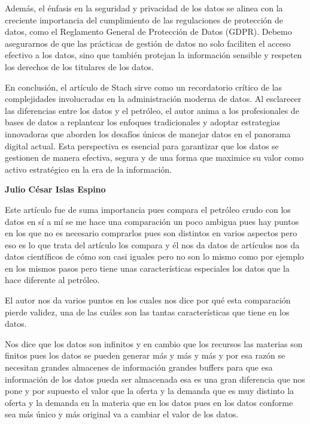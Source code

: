 Además, el énfasis en la seguridad y privacidad de los datos se alinea con la creciente importancia del cumplimiento de las regulaciones de protección de datos, como el Reglamento General de Protección de Datos (GDPR). Debemo asegurarnos de que las prácticas de gestión de datos no solo faciliten el acceso efectivo a los datos, sino que también protejan la información sensible y respeten los derechos de los titulares de los datos.

En conclusión, el artículo de Stach sirve como un recordatorio crítico de las complejidades involucradas en la administración moderna de datos. Al esclarecer las diferencias entre los datos y el petróleo, el autor anima a los profesionales de bases de datos a replantear los enfoques tradicionales y adoptar estrategias innovadoras que aborden los desafíos únicos de manejar datos en el panorama digital actual. Esta perspectiva es esencial para garantizar que los datos se gestionen de manera efectiva, segura y de una forma que maximice su valor como activo estratégico en la era de la información.

\begin{center}
    \textbf{Julio César Islas Espino}    
\end{center}

Este artículo fue de suma importancia pues compara el petróleo crudo con los datos en sí a mí se me hace una comparación un poco ambigua pues hay puntos en los que no es necesario comprarlos pues son distintos en varios aspectos pero eso es lo que trata del artículo los compara y él nos da datos de artículos nos da datos científicos de cómo son casi iguales pero no son lo mismo como por ejemplo en los mismos pasos pero tiene unas características especiales los datos que la hace diferente al petróleo.

El autor nos da varios puntos en los cuales nos dice por qué esta comparación pierde validez, una de las cuáles son las tantas características que tiene en los datos.

Nos dice que los datos son infinitos y en cambio que los recursos las materias son finitos pues los datos se pueden generar más y más y más y por esa razón se necesitan grandes almacenes de información grandes buffers para que esa información de los datos pueda ser almacenada esa es una gran diferencia que nos pone y por supuesto el valor que la oferta y la demanda que es muy distinto la oferta y la demanda en la materia que en los datos pues en los datos conforme sea más único y más original va a cambiar el valor de los datos.


